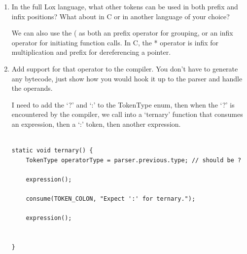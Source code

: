 \documentclass{article}
\begin{document}
\begin{enumerate}
    \item {
        In the full Lox language, what other tokens can be used in both prefix and infix positions? What about in C or in another language of your choice?

        We can also use the ( as both an prefix operator for grouping, or an infix 
        operator for initiating function calls. In C, the * operator is infix for 
        multiplication and prefix for dereferencing a pointer.
    }

    \item {
        Add support for that operator to the compiler. You don’t have to generate any bytecode, just show how you would hook it up to the parser and handle the operands.

        I need to add the `?' and `:' to the TokenType enum, then when the `?' is 
        encountered by the compiler, we call into a `ternary' function that consumes 
        an expression, then a `:' token, then another expression.
        \begin{verbatim}

static void ternary() {
    TokenType operatorType = parser.previous.type; // should be ?

    expression();

    consume(TOKEN_COLON, "Expect ':' for ternary.");

    expression();


}

        \end{verbatim}
    }
\end{enumerate}
\end{document}
